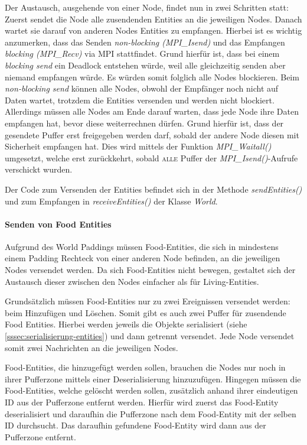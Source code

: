 \documentclass[course=erap]{aspdoc}
\begin{document}
Der Austausch, ausgehende von einer Node, findet nun in zwei Schritten statt: Zuerst sendet die Node alle zusendenden Entities an die jeweiligen Nodes. Danach wartet sie darauf von anderen Nodes Entities zu empfangen. Hierbei ist es wichtig anzumerken, dass das Senden \emph{non-blocking (MPI\_Isend)} und das Empfangen \emph{blocking (MPI\_Recv)} via MPI stattfindet. Grund hierfür ist, dass bei einem \emph{blocking send} ein Deadlock entstehen würde, weil alle gleichzeitig senden aber niemand empfangen würde. Es würden somit folglich alle Nodes blockieren. Beim \emph{non-blocking send} können alle Nodes, obwohl der Empfänger noch nicht auf Daten wartet, trotzdem die Entities versenden und werden nicht blockiert. Allerdings müssen alle Nodes am Ende darauf warten, dass jede Node ihre Daten empfangen hat, bevor diese weiterrechnen dürfen. Grund hierfür ist, dass der gesendete Puffer erst freigegeben werden darf, sobald der andere Node diesen mit Sicherheit empfangen hat. Dies wird mittels der Funktion \emph{MPI\_Waitall()} umgesetzt, welche erst zurückkehrt, sobald \textsc{alle} Puffer der \emph{MPI\_Isend()}-Aufrufe verschickt wurden.

Der Code zum Versenden der Entities befindet sich in der Methode \emph{sendEntities()} und zum Empfangen in \emph{receiveEntities()} der Klasse \emph{World}.


\paragraph{Senden von Food Entities}
Aufgrund des World Paddings müssen Food-Entities, die sich in mindestens einem Padding Rechteck von einer anderen Node befinden, an die jeweiligen Nodes versendet werden. Da sich Food-Entities nicht bewegen, gestaltet sich der Austausch dieser zwischen den Nodes einfacher als für Living-Entities.

Grundsätzlich müssen Food-Entities nur zu zwei Ereignissen versendet werden: beim Hinzufügen und Löschen. Somit gibt es auch zwei Puffer für zusendende Food Entities. Hierbei werden jeweils die Objekte serialisiert (siehe \ref{sssec:serialisierung-entities}) und dann getrennt versendet. Jede Node versendet somit zwei Nachrichten an die jeweiligen Nodes.

Food-Entities, die hinzugefügt werden sollen, brauchen die Nodes nur noch in ihrer Pufferzone mittels einer Deserialisierung hinzuzufügen. Hingegen müssen die Food-Entities, welche gelöscht werden sollen, zusätzlich anhand ihrer eindeutigen ID aus der Pufferzone entfernt werden. Hierfür wird zuerst das Food-Entity deserialisiert und daraufhin die Pufferzone nach dem Food-Entity mit der selben ID durchsucht. Das daraufhin gefundene Food-Entity wird dann aus der Pufferzone entfernt.
\end{document}
